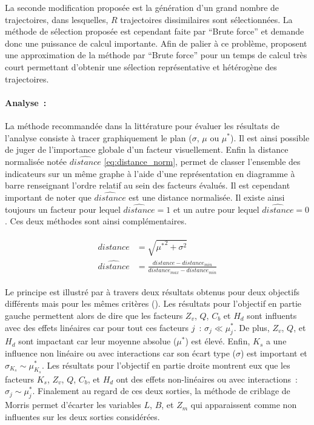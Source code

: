 La seconde modification proposée est la génération d’un grand nombre de trajectoires,
dans lesquelles, $R$ trajectoires dissimilaires sont sélectionnées. La méthode de sélection
proposée est cependant faite par \enquote{Brute force} et demande donc une puissance de
calcul importante.
Afin de palier à ce problème, \textcite{Ruano2012103} proposent une approximation de
la méthode par \enquote{Brute force} pour un temps de calcul très court permettant d’obtenir
une sélection représentative et hétérogène des trajectoires.

\paragraph{Analyse~:} %
\label{par:analyse}
La méthode recommandée dans la littérature pour évaluer les résultats de l’analyse
consiste à tracer graphiquement le plan ($\sigma$, $\mu$ ou $\mu^{*}$). Il est
ainsi possible de juger de l’importance globale d’un facteur visuellement.
Enfin la distance normalisée notée $\hat{distance}$ \eqref{eq:distance_norm}, permet
de classer l’ensemble des indicateurs sur un même graphe à l’aide d’une représentation
en diagramme à barre renseignant l’ordre relatif au sein des facteurs évalués.
Il est cependant important de noter que $\hat{distance}$ est une distance
normalisée. Il existe ainsi toujours un facteur pour lequel $\hat{distance} = 1$ et un autre
pour lequel $\hat{distance} = 0$. Ces deux méthodes sont ainsi complémentaires.

\begin{align}\label{eq:distance_norm}
    \begin{split}
        distance        &= \sqrt{{\mu^{*}}^2 + \sigma^{2}} \\
        \hat{distance}  &=  \frac{distance - distance_{min}}{distance_{max} - distance_{min}}
    \end{split}
\end{align}

Le principe est illustré par \textcite{Iooss2011} à travers deux résultats obtenus
pour deux objectifs différents mais pour les mêmes critères ().
Les résultats pour l’objectif en partie gauche permettent alors de dire que
les facteurs $Z_{v}$, $Q$, $C_{b}$ et $H_{d}$ sont influents
avec des effets linéaires car pour tout ces facteurs $j$~: $\sigma_{j} \ll \mu^{*}_{j}$.
De plus, $Z_{v}$, $Q$, et $H_{d}$ sont impactant car leur moyenne absolue ($\mu^{*}$) est élevé.
Enfin, $K_{s}$ a une influence non linéaire ou avec interactions car son écart type ($\sigma$)
est important et  $\sigma_{K_{s}} \sim \mu^{*}_{K_{s}}$.
Les résultats pour l’objectif en partie droite montrent eux que les facteurs $K_{s}$, $Z_{v}$, $Q$, $C_{b}$,
et $H_{d}$ ont des effets non-linéaires ou avec interactions~: $\sigma_{j} \sim
\mu^{*}_{j}$. Finalement au regard de ces deux sorties, la méthode de criblage de Morris
permet d’écarter les variables $L$, $B$, et $Z_{m}$ qui apparaissent comme non influentes
sur les deux sorties considérées.

